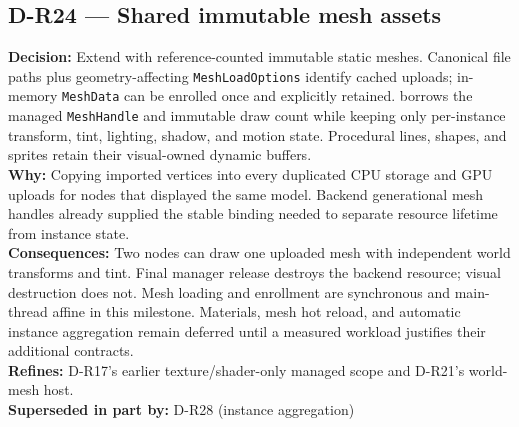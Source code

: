 \subsection*{D-R24 --- Shared immutable mesh assets}
\begin{decisionbox}[title={D-R24 \quad 2026-09-16}]
\textbf{Decision:} Extend  with reference-counted
immutable static meshes. Canonical file paths plus geometry-affecting
\texttt{MeshLoadOptions} identify cached uploads; in-memory \texttt{MeshData}
can be enrolled once and explicitly retained.  borrows the
managed \texttt{MeshHandle} and immutable draw count while keeping only
per-instance transform, tint, lighting, shadow, and motion state. Procedural
lines, shapes, and sprites retain their visual-owned dynamic buffers.\\
\textbf{Why:} Copying imported vertices into every 
duplicated CPU storage and GPU uploads for nodes that displayed the same model.
Backend generational mesh handles already supplied the stable binding needed to
separate resource lifetime from instance state.\\
\textbf{Consequences:} Two nodes can draw one uploaded mesh with independent
world transforms and tint. Final manager release destroys the backend resource;
visual destruction does not. Mesh loading and enrollment are synchronous and
main-thread affine in this milestone. Materials, mesh hot reload, and automatic
instance aggregation remain deferred until a measured workload justifies their
additional contracts.\\
\textbf{Refines:} D-R17's earlier texture/shader-only managed scope and D-R21's
world-mesh host.\\
\textbf{Superseded in part by:} D-R28 (instance aggregation)
\end{decisionbox}

